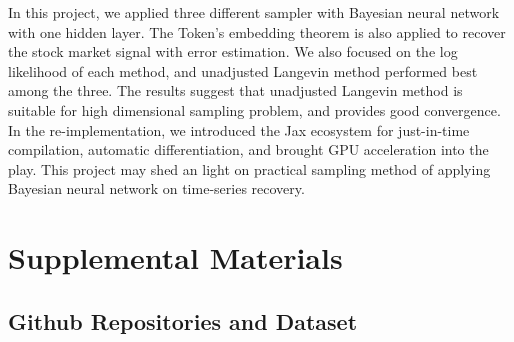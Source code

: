 \documentclass{article}
\newcommand{\beginsupplement}{%
        \setcounter{table}{0}
        \renewcommand{\thetable}{S\arabic{table}}%
        \setcounter{figure}{0}
        \renewcommand{\thefigure}{S\arabic{figure}}%
        \setcounter{section}{0}
        \renewcommand{\thesection}{S\arabic{section}}%
        \setcounter{equation}{0}
        \renewcommand{\theequation}{S\arabic{equation}}%
     }
\begin{document}
In this project, we applied three different sampler with Bayesian neural network with one hidden layer. The Token's embedding theorem is also applied to recover the stock market signal with error estimation. We also focused on the log likelihood of each method, and unadjusted Langevin method performed best among the three. The results suggest that unadjusted Langevin method is suitable for high dimensional sampling problem, and provides good convergence. In the re-implementation, we introduced the Jax ecosystem for just-in-time compilation, automatic differentiation, and brought GPU acceleration into the play. This project may shed an light on practical sampling method of applying Bayesian neural network on time-series recovery.



\beginsupplement
\section{Supplemental Materials}

\subsection{Github Repositories and Dataset}
\end{document}
